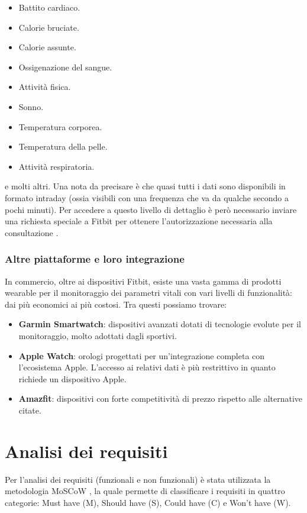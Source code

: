 \documentclass[12pt,a4paper,oneside]{report}
\begin{document}
\begin{itemize}
  \item Battito cardiaco.
  \item Calorie bruciate.
  \item Calorie assunte.
  \item Ossigenazione del sangue.
  \item Attività fisica.
  \item Sonno.
  \item Temperatura corporea.
  \item Temperatura della pelle.
  \item Attività respiratoria.
\end{itemize}

e molti altri.
Una nota da precisare è che quasi tutti i dati sono disponibili in formato intraday (ossia visibili con una frequenza che va da qualche secondo a pochi minuti). Per accedere a questo livello di dettaglio è però necessario inviare una richiesta speciale a Fitbit per ottenere l'autorizzazione necessaria alla consultazione \cite{fitbitapi}.

\subsection{Altre piattaforme e loro integrazione}

In commercio, oltre ai dispositivi Fitbit, esiste una vasta gamma di prodotti wearable per il monitoraggio dei parametri vitali con vari livelli di funzionalità: dai più economici ai più costosi. Tra questi possiamo trovare:

\begin{itemize}
  \item \textbf{Garmin Smartwatch}: dispositivi avanzati dotati di tecnologie evolute per il monitoraggio, molto adottati dagli sportivi. \cite{mysql}
  \item \textbf{Apple Watch}: orologi progettati per un'integrazione completa con l'ecosistema Apple. L'accesso ai relativi dati è più restrittivo in quanto richiede un dispositivo Apple. \cite{applewatch}
  \item \textbf{Amazfit}: dispositivi con forte competitività di prezzo rispetto alle alternative citate. \cite{amazfit}
\end{itemize}



\chapter{Analisi dei requisiti}
Per l'analisi dei requisiti (funzionali e non funzionali) è stata utilizzata la metodologia MoSCoW \cite{moscow}, la quale permette di classificare i requisiti in quattro categorie: Must have (M), Should have (S), Could have (C) e Won't have (W).
\end{document}
